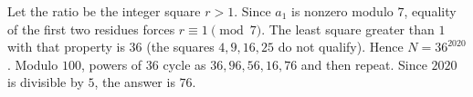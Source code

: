 Let the ratio be the integer square $r>1$. Since $a_1$ is nonzero modulo $7$, equality of the first two residues forces $r\equiv1\pmod7$. The least square greater than $1$ with that property is $36$ (the squares $4,9,16,25$ do not qualify). Hence $N=36^{2020}$. Modulo $100$, powers of $36$ cycle as $36,96,56,16,76$ and then repeat. Since $2020$ is divisible by $5$, the answer is $\boxed{76}$.
